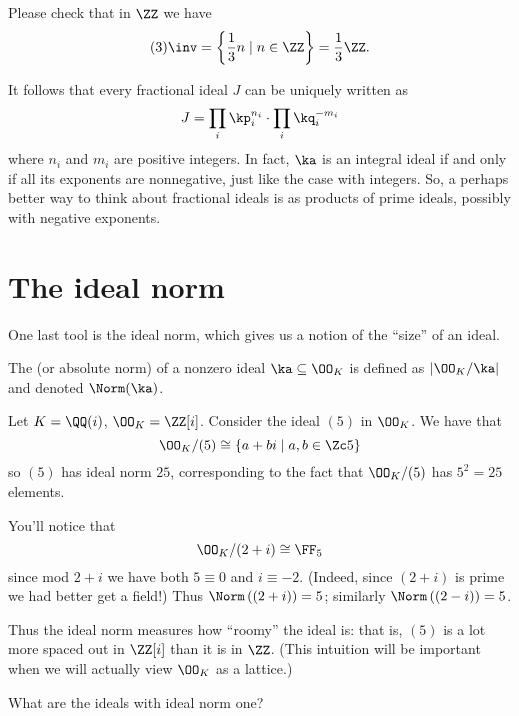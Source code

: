 \begin{example}[$(3)\inv$ in $\ZZ$]
	Please check that in $\ZZ$ we have
	\[ (3)\inv = \left\{ \frac 13 n \mid n \in \ZZ \right\} = \frac 13 \ZZ. \]
\end{example}

It follows that every fractional ideal $J$ can be uniquely written as
\[ J = \prod_i \kp_i^{n_i} \cdot \prod_i \kq_i^{-m_i} \]
where $n_i$ and $m_i$ are positive integers.
In fact, $\ka$ is an integral ideal if and only if all its exponents are nonnegative,
just like the case with integers.
So, a perhaps better way to think about fractional ideals is
as products of prime ideals, possibly with negative exponents.

\section{The ideal norm}
One last tool is the ideal norm,
which gives us a notion of the ``size'' of an ideal.
\begin{definition}
	The  (or absolute norm)
	of a nonzero ideal $\ka \subseteq \OO_K$ is defined as
	$|\OO_K / \ka|$ and denoted $\Norm(\ka)$.
\end{definition}
\begin{example}
	Let $K = \QQ(i)$, $\OO_K = \ZZ[i]$.
	Consider the ideal $(5)$ in $\OO_K$.
	We have that
	\[ \OO_K / (5) \cong \{ a+bi \mid a,b \in \Zc5 \} \]
	so $(5)$ has ideal norm $25$,
	corresponding to the fact that $\OO_K/(5)$ has $5^2=25$ elements.
\end{example}

\begin{example}
	You'll notice that \[ \OO_K / (2+i) \cong \FF_5 \]
	since mod $2+i$ we have both $5 \equiv 0$ and $i \equiv -2$.
	(Indeed, since $(2+i)$ is prime we had better get a field!)
	Thus $\Norm\left( (2+i) \right) = 5$; similarly $\Norm\left( (2-i) \right) = 5$.
\end{example}

Thus the ideal norm measures how ``roomy'' the ideal is:
that is, $(5)$ is a lot more spaced out in $\ZZ[i]$ than it is in $\ZZ$.
(This intuition will be important when we will actually view $\OO_K$ as a lattice.)

\begin{ques}
	What are the ideals with ideal norm one?
\end{ques}

